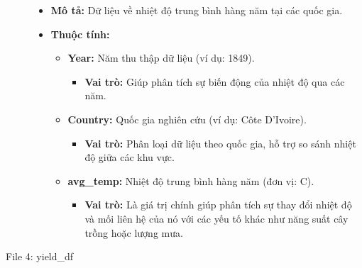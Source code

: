\begin{description}
    \begin{itemize}
        \item \textbf{Mô tả:} Dữ liệu về nhiệt độ trung bình hàng năm tại các quốc gia.
        \item \textbf{Thuộc tính:}
        \begin{itemize}
            \item \textbf{Year:} Năm thu thập dữ liệu (ví dụ: 1849).
            \begin{itemize}
                \item \textbf{Vai trò:} Giúp phân tích sự biến động của nhiệt độ qua các năm.
            \end{itemize}
            \item \textbf{Country:} Quốc gia nghiên cứu (ví dụ: Côte D'Ivoire).
            \begin{itemize}
                \item \textbf{Vai trò:} Phân loại dữ liệu theo quốc gia, hỗ trợ so sánh nhiệt độ giữa các khu vực.
            \end{itemize}
            \item \textbf{avg\_temp:} Nhiệt độ trung bình hàng năm (đơn vị: \textdegree C).
            \begin{itemize}
                \item \textbf{Vai trò:} Là giá trị chính giúp phân tích sự thay đổi nhiệt độ và mối liên hệ của nó với các yếu tố khác như năng suất cây trồng hoặc lượng mưa.
            \end{itemize}
        \end{itemize}
    \end{itemize}

    \item[File 4: yield\_df]


\end{description}
